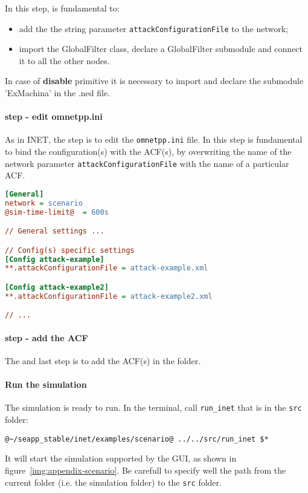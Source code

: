 In this step, is fundamental to:
%
\begin{itemize}
\item add the the string parameter \texttt{attackConfigurationFile} to the network;
\item import the GlobalFilter class, declare a GlobalFilter submodule and connect it to all the other nodes.
\end{itemize}

In case of \textbf{disable} primitive it is necessary to import and declare the submodule 'ExMachina' in the .ned file.   

\paragraph{ step - edit omnetpp.ini}
As in INET, the  step is to edit the \texttt{omnetpp.ini} file. In this step is fundamental to bind the configuration(s) with the ACF(s), by overwriting the name of the network parameter \texttt{attackConfigurationFile} with the name of a particular ACF.
%
\begin{lstlisting}[language={ini}]
[General]
network = scenario
@sim-time-limit@  = 600s

// General settings ...

// Config(s) specific settings
[Config attack-example]
**.attackConfigurationFile = attack-example.xml

[Config attack-example2]
**.attackConfigurationFile = attack-example2.xml

// ...
\end{lstlisting}

\paragraph{ step - add the ACF}
The  and last step is to add the ACF(s) in the folder.

\paragraph{Run the simulation}
The simulation is ready to run. In the terminal, call \texttt{run\_inet} that is in the \texttt{src} folder:
%
\begin{lstlisting}[language={terminal}]
@~/seapp_stable/inet/examples/scenario@ ../../src/run_inet $*
\end{lstlisting}
%
It will start the simulation supported by the GUI, as shown in figure~\ref{img:appendix-scenario}. Be carefull to specify well the path from the current folder (i.e. the simulation folder) to the \texttt{src} folder. 

